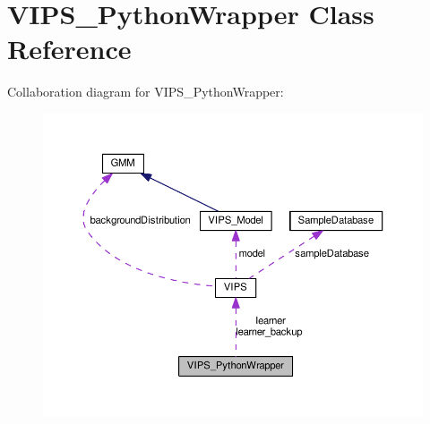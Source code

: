\hypertarget{classVIPS__PythonWrapper}{}\section{V\+I\+P\+S\+\_\+\+Python\+Wrapper Class Reference}
\label{classVIPS__PythonWrapper}


Collaboration diagram for V\+I\+P\+S\+\_\+\+Python\+Wrapper\+:\nopagebreak
\begin{figure}[H]
\begin{center}
\leavevmode
\includegraphics[width=350pt]{classVIPS__PythonWrapper__coll__graph}
\end{center}
\end{figure}
